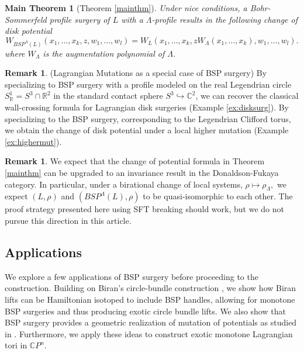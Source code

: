 \documentclass[11pt, oneside,dvipsnames]{amsart}
\newcommand{\<}{\langle}
\renewcommand{\>}{\rangle}
\newcommand{\bC}{\mathbb{C}}
\newcommand{\bR}{\mathbb{R}}
\newtheorem{thm*}{Main Theorem}
\theoremstyle{definition}
\newenvironment{fthm}
  {\begin{mdframed}\begin{thm*}}
  {\end{thm*}\end{mdframed}}
\theoremstyle{definition}
\newtheorem{remark}[Theorem]{Remark}
\numberwithin{equation}{subsection}
\begin{document}
\vspace{5pt}\vspace{5pt}
\begin{fthm}[Theorem \ref{mainthm}]\label{mainthmintro}
Under nice conditions, a Bohr-Sommerfeld profile surgery of $L$ with a $\Lambda$-profile results in the following change of disk potential
    \begin{equation*}\label{mainform}
        W_{BSP^\Lambda(L)}(x_1,\dots,x_k,z,w_1,\dots,w_l)
 =W_L(x_1,\dots,x_k,zW_{\Lambda}(x_1,\dots,x_k),w_1,\dots,w_l).     \end{equation*}
where $W_\Lambda$ is the augmentation polynomial of $\Lambda$.

 
\end{fthm}



\begin{remark}{(Lagrangian Mutations as a special case of BSP surgery)} By specializing to BSP surgery with a profile modeled on the real Legendrian circle $S^1_{\bR} = S^3 \cap \bR^2$ in the standard contact sphere $S^3 \hookrightarrow \bC^2$, we can recover the classical wall-crossing formula \cite{Aur07,PW19,ch10} for Lagrangian disk surgeries (Example \ref{ex:disksurg}). By specializing to the BSP surgery, corresponding to the Legendrian Clifford torus, we obtain the change of disk potential under a local higher mutation (Example \ref{ex:highermut}).
\end{remark}

\begin{remark}
    We expect that the change of potential formula in Theorem \ref{mainthm} can be upgraded to an invariance result in the Donaldson-Fukaya category. In particular, under a birational change of local systems, $\rho \mapsto \rho_\Lambda,$ we expect $(L,\rho)$ and $(BSP^\Lambda(L),\rho)$ to be quasi-isomorphic to each other. The proof strategy presented here using SFT breaking should work, but we do not pursue this direction in this article.
\end{remark}


\subsection{Applications}

We explore a few applications of BSP surgery before proceeding to the construction. Building on Biran's circle-bundle construction \cite{Biran_lagrangina_barrier,b06,bc09}, we show how Biran lifts can be Hamiltonian isotoped to include BSP handles, allowing for monotone BSP surgeries and thus producing exotic circle bundle lifts. We also show that BSP surgery provides a geometric realization of mutation of potentials as studied in \cite{21coates,cruzgalkin,minksum}. Furthermore, we apply these ideas to construct exotic monotone Lagrangian tori in $\bC P^n$.
\end{document}
